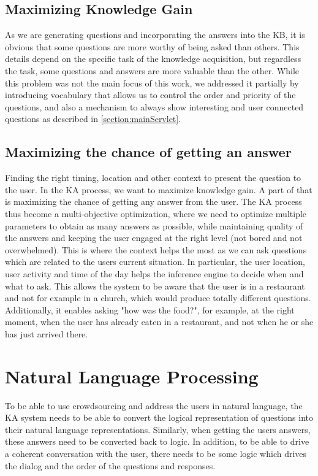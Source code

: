 \subsection{Maximizing Knowledge Gain} 
As we are generating questions and incorporating the answers into the KB, it 
is obvious that some questions are more worthy of being asked than others. 
This details depend on the specific task of the knowledge acquisition, but 
regardless the task, some questions and answers are more valuable than the 
other. While this problem was not the main focus of this work, we addressed it 
partially by introducing vocabulary that allows us to control the order and 
priority of the questions, and also a mechanism to always show interesting
and user connected questions as described in \autoref{section:mainServlet}.

\subsection{Maximizing the chance of getting an answer}
Finding the right timing, location and other context to present the question
to the user. In the KA process, we want to maximize knowledge gain. A part of 
that is maximizing the chance of getting any answer from the user. The KA 
process thus become a multi-objective optimization, where we need to optimize 
multiple parameters to obtain as many answers as possible, while maintaining 
quality of the answers and keeping the user engaged at the right level (not 
bored and not overwhelmed). This is where the context helps the most as we can 
ask questions which are related to the users current situation. In particular, 
the user location, user activity and time of the day helps the inference 
engine to decide when and what to ask. This allows the system to be aware that 
the user is in a restaurant and not for example in a church, which would 
produce  totally different questions. Additionally, it enables asking 
"how was the food?", for example, at the right moment, when the user has 
already eaten in a restaurant, and not when he or she has just arrived there.

\section{Natural Language Processing}
\label{section:bg:nlp}
To be able to use crowdsourcing and address the users in natural language, the 
KA system needs to be able to convert the logical representation of questions 
into their natural language representations. Similarly, when getting the users 
answers, these answers need to be converted back to logic. In addition, to be 
able to drive a coherent conversation with the user, there needs to be some 
logic which drives the dialog and the order of the questions and responses.

